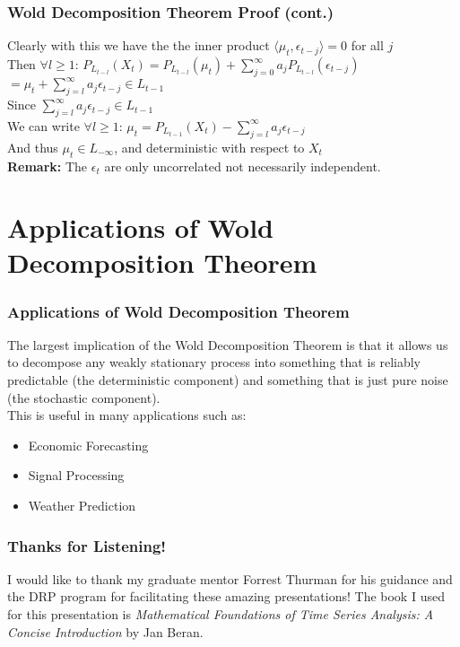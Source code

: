 \documentclass{beamer}
\begin{document}
\begin{frame}
    \frametitle{Wold Decomposition Theorem Proof (cont.)}
    Clearly with this we have the the inner product $\langle \mu_t, \epsilon_{t-j} \rangle = 0$ for all $j$\\
    Then $\forall l \geq 1$: $P_{L_{t-l}}(X_t) = P_{L_{t-l}}(\mu_t) + \sum_{j=0}^{\infty} a_j P_{L_{t-l}}(\epsilon_{t-j})$\\
    $= \mu_t + \sum_{j=l}^{\infty} a_j \epsilon_{t-j} \in L_{t-1}$\\
    Since $\sum_{j=l}^{\infty} a_j \epsilon_{t-j} \in L_{t-1}$\\ 
    We can write $\forall l \geq 1$: $\mu_t = P_{L_{t-1}}(X_t) - \sum_{j=l}^{\infty} a_j \epsilon_{t-j}$\\ 
    And thus $\mu_t \in L_{-\infty}$, and deterministic with respect to $X_t$\\
    \textbf{Remark:} The $\epsilon_t$ are only uncorrelated not necessarily independent. 
\end{frame}

\section{Applications of Wold Decomposition Theorem}
\begin{frame}
    \frametitle{Applications of Wold Decomposition Theorem}
    The largest implication of the Wold Decomposition Theorem is that it allows us to decompose any weakly stationary process into something that is reliably predictable (the deterministic component) and something that is just pure noise (the stochastic component).\\
    This is useful in many applications such as:
    \begin{itemize}
        \item Economic Forecasting
        \item Signal Processing
        \item Weather Prediction
    \end{itemize}
    
\end{frame}

\begin{frame}
    \frametitle{Thanks for Listening!}
    I would like to thank my graduate mentor Forrest Thurman for his guidance and the DRP program for facilitating these amazing presentations! The book I used for this presentation is \textit{Mathematical Foundations of Time Series Analysis: A Concise Introduction} by Jan Beran.


\end{frame}
\end{document}
